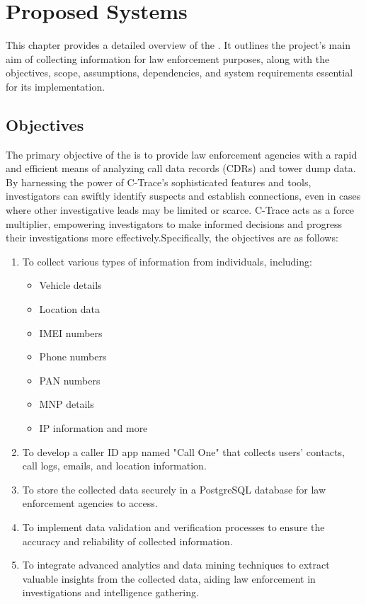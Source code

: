 
\chapter{Proposed Systems}
\justify

This chapter provides a detailed overview of the \textbf{{\myprojectname}}. It outlines the project's main aim of collecting information for law enforcement purposes, along with the objectives, scope, assumptions, dependencies, and system requirements essential for its implementation.

\section{Objectives}
The primary objective of the \textbf{{\myprojectname}} is to provide law enforcement agencies with a rapid and efficient means of analyzing call data records (CDRs) and tower dump data. By harnessing the power of C-Trace's sophisticated features and tools, investigators can swiftly identify suspects and establish connections, even in cases where other investigative leads may be limited or scarce. C-Trace acts as a force multiplier, empowering investigators to make informed decisions and progress their investigations more effectively.Specifically, the objectives are as follows:
\begin{enumerate}[label=\arabic*.]
    \item To collect various types of information from individuals, including:
    \begin{itemize}
        \item Vehicle details
        \item Location data
        \item IMEI numbers
        \item Phone numbers
        \item PAN numbers
        \item MNP details
        \item IP information and more
    \end{itemize}
    \item To develop a caller ID app named "Call One" that collects users' contacts, call logs, emails, and location information.
    \item To store the collected data securely in a PostgreSQL database for law enforcement agencies to access.
    \item To implement data validation and verification processes to ensure the accuracy and reliability of collected information.
    \item To integrate advanced analytics and data mining techniques to extract valuable insights from the collected data, aiding law enforcement in investigations and intelligence gathering.
\end{enumerate}

